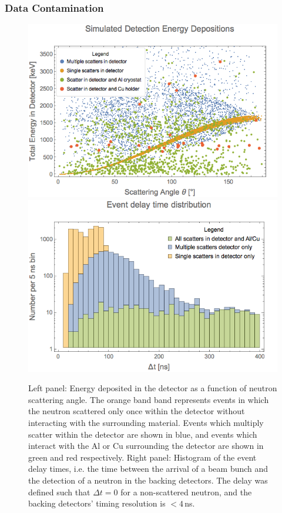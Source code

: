 \subsubsection{Data Contamination}
\begin{figure}[tb]
\centering
\includegraphics[width=0.45\hsize]{Figures/single_multiple_scatters_geant}
\includegraphics[width=0.45\hsize]{Figures/Delta_t_histograms}
\caption{Left panel: %
Energy deposited in the detector as a function of neutron scattering angle. The orange band band represents events in which the neutron scattered only once within the detector without interacting with the surrounding material. Events which multiply scatter within the detector are shown in blue, and events which interact with the Al or Cu surrounding the detector are shown in green and red respectively. Right panel: Histogram of the event delay times, i.e. the time between the arrival of a beam bunch and the detection of a neutron in the backing detectors. The delay was defined such that \(\Delta t=0\) for a non-scattered neutron, and the backing detectors' timing resolution is \(< 4\,\)ns.
\vspace{-3ex}
}
\label{fig:geant}
\end{figure}

